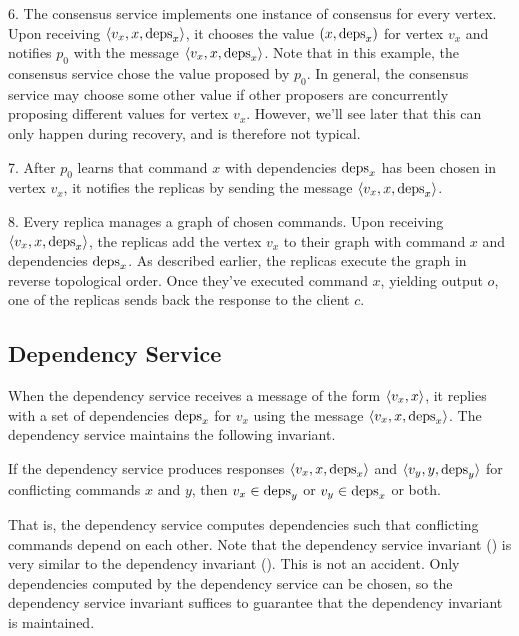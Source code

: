 6. The consensus service implements one instance of consensus for every vertex.
Upon receiving $\langle v_x, x, \text{deps}_x \rangle$, it chooses the value $(x, \text{deps}_x)$
for vertex $v_x$ and notifies $p_0$ with the message $\langle v_x, x, \text{deps}_x \rangle$.
Note that in this example, the consensus service chose the value proposed by
$p_0$. In general, the consensus service may choose some other value if other
proposers are concurrently proposing different values for vertex $v_x$.
However, we'll see later that this can only happen during recovery, and is
therefore not typical.

7. After $p_0$ learns that command $x$ with dependencies $\text{deps}_x$ has been
chosen in vertex $v_x$, it notifies the replicas by sending the message
$\langle v_x, x, \text{deps}_x \rangle$.

8. Every replica manages a graph of chosen commands. Upon receiving $\langle v_x,
x, \text{deps}_x \rangle$, the replicas add the vertex $v_x$ to their graph with command
$x$ and dependencies $\text{deps}_x$. As described earlier, the replicas execute
the graph in reverse topological order. Once they've executed command $x$,
yielding output $o$, one of the replicas sends back the response to the client
$c$.

{}

\subsection{Dependency Service}
When the dependency service receives a message of the form $\langle v_x, x \rangle$, it
replies with a set of dependencies $\text{deps}_x$ for $v_x$ using the message
$\langle v_x, x, \text{deps}_x \rangle$. The dependency service maintains the following
invariant.

\begin{invariant}%
  If the dependency service produces responses $\langle v_x, x, \text{deps}_x \rangle$ and
  $\langle v_y, y, \text{deps}_y \rangle$ for conflicting commands $x$ and $y$, then $v_x \in
  \text{deps}_y$ or $v_y \in \text{deps}_x$ or both.
\end{invariant}

That is, the dependency service computes dependencies such that conflicting
commands depend on each other. Note that the dependency service invariant
() is very similar to the dependency invariant
(). This is not an accident. Only dependencies computed by
the dependency service can be chosen, so the dependency service invariant
suffices to guarantee that the dependency invariant is maintained.

